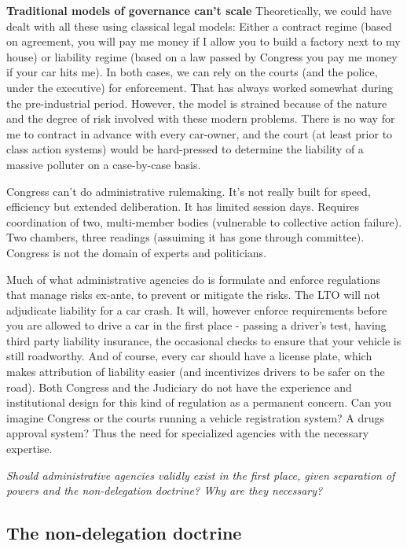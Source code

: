 \documentclass[../main.tex]{subfiles}
\begin{document}
\begin{shaded}
    \textbf{Traditional models of governance can't scale} Theoretically, we could have dealt with all these using classical legal models: Either a contract regime (based on agreement, you will pay me money if I allow you to build a factory next to my house) or liability regime (based on a law passed by Congress you pay me money if your car hits me). In both cases, we can rely on the courts (and the police, under the executive) for enforcement. That has always worked somewhat during the pre-industrial period. However, the model is strained because of the nature and the degree of risk involved with these modern problems. There is no way for me to contract in advance with every car-owner, and the court (at least prior to class action systems) would be hard-pressed to determine the liability of a massive polluter on a case-by-case basis.

    Congress can’t do administrative rulemaking. It’s not really built for speed, efficiency but extended deliberation. It has limited session days. Requires coordination of two, multi-member bodies (vulnerable to collective action failure). Two chambers, three readings (assuiming it has gone through committee). Congress is not the domain of experts and politicians.
\end{shaded}

Much of what administrative agencies do is formulate and enforce regulations that manage risks ex-ante, to prevent or mitigate the risks. The LTO will not adjudicate liability for a car crash. It will, however enforce requirements before you are allowed to drive a car in the first place - passing a driver's test, having third party liability insurance, the occasional checks to ensure that your vehicle is still roadworthy. And of course, every car should have a license plate, which makes attribution of liability easier (and incentivizes drivers to be safer on the road). Both Congress and the Judiciary do not have the experience and institutional design for this kind of regulation as a permanent concern. Can you imagine Congress or the courts running a vehicle registration system? A drugs approval system? Thus the need for specialized agencies with the necessary expertise.

\textit{Should administrative agencies validly exist in the first place, given separation of powers and the non-delegation doctrine? Why are they necessary?}

 
\subsection{The non-delegation doctrine}
\end{document}
